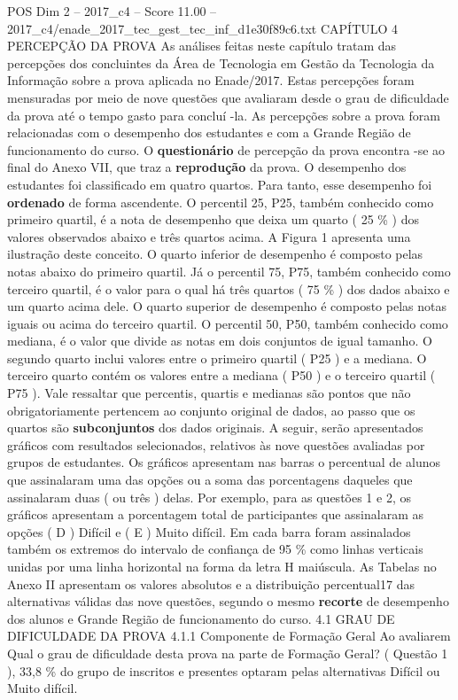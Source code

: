 \begin{textsample}{POS Dim 2 – 2017\_c4 – Score 11.00 – 2017\_c4/enade\_2017\_tec\_gest\_tec\_inf\_d1e30f89c6.txt}  \label{ex:f2_pos_099}
CAPÍTULO 4 PERCEPÇÃO DA PROVA As análises feitas neste capítulo tratam das percepções dos concluintes da Área de Tecnologia em Gestão da Tecnologia da Informação sobre a prova aplicada no Enade/2017.
Estas percepções foram mensuradas por meio de nove questões que avaliaram desde o grau de dificuldade da prova até o tempo gasto para concluí -la.
As percepções sobre a prova foram relacionadas com o desempenho dos estudantes e com a Grande Região de funcionamento do curso.
O \textbf{questionário} de percepção da prova encontra -se ao final do Anexo VII, que traz a \textbf{reprodução} da prova.
O desempenho dos estudantes foi classificado em quatro quartos.
Para tanto, esse desempenho foi \textbf{ordenado} de forma ascendente.
O percentil 25, P25, também conhecido como primeiro quartil, é a nota de desempenho que deixa um quarto ( 25 \% ) dos valores observados abaixo e três quartos acima.
A Figura 1 apresenta uma ilustração deste conceito.
O quarto inferior de desempenho é composto pelas notas abaixo do primeiro quartil.
Já o percentil 75, P75, também conhecido como terceiro quartil, é o valor para o qual há três quartos ( 75 \% ) dos dados abaixo e um quarto acima dele.
O quarto superior de desempenho é composto pelas notas iguais ou acima do terceiro quartil.
O percentil 50, P50, também conhecido como mediana, é o valor que divide as notas em dois conjuntos de igual tamanho.
O segundo quarto inclui valores entre o primeiro quartil ( P25 ) e a mediana.
O terceiro quarto contém os valores entre a mediana ( P50 ) e o terceiro quartil ( P75 ).
Vale ressaltar que percentis, quartis e medianas são pontos que não obrigatoriamente pertencem ao conjunto original de dados, ao passo que os quartos são \textbf{subconjuntos} dos dados originais.
A seguir, serão apresentados gráficos com resultados selecionados, relativos às nove questões avaliadas por grupos de estudantes.
Os gráficos apresentam nas barras o percentual de alunos que assinalaram uma das opções ou a soma das porcentagens daqueles que assinalaram duas ( ou três ) delas.
Por exemplo, para as questões 1 e 2, os gráficos apresentam a porcentagem total de participantes que assinalaram as opções ( D ) Difícil e ( E ) Muito difícil.
Em cada barra foram assinalados também os extremos do intervalo de confiança de 95 \% como linhas verticais unidas por uma linha horizontal na forma da letra H maiúscula.
As Tabelas no Anexo II apresentam os valores absolutos e a distribuição percentual17 das alternativas válidas das nove questões, segundo o mesmo \textbf{recorte} de desempenho dos alunos e Grande Região de funcionamento do curso. 4.1 GRAU DE DIFICULDADE DA PROVA 4.1.1 Componente de Formação Geral Ao avaliarem Qual o grau de dificuldade desta prova na parte de Formação Geral? ( Questão 1 ), 33,8 \% do grupo de inscritos e presentes optaram pelas alternativas Difícil ou Muito difícil.

\end{textsample}
